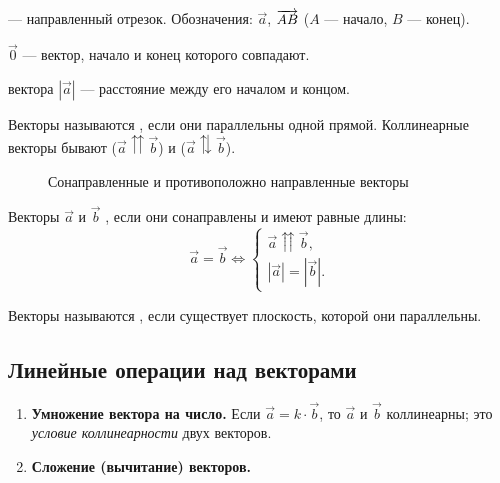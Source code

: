 \documentclass[11pt,a4paper]{article}
\begin{document}
\begin{opr}
 — направленный отрезок. Обозначения: $\vec a$, $\overrightarrow{AB}$ ($A$ — начало, $B$ — конец).
\end{opr}
\begin{opr}
 $\vec 0$ — вектор, начало и конец которого совпадают.
\end{opr}
\begin{opr}
 вектора $|\vec a|$ — расстояние между его началом и концом.
\end{opr}
\begin{opr}
Векторы называются , если они параллельны одной прямой. Коллинеарные векторы бывают
 ($\vec a\upuparrows\vec b$) и  ($\vec a\updownarrows\vec b$).
\end{opr}

\begin{figure}[H]
\centering
{}
\caption{Сонаправленные и противоположно направленные векторы}
\end{figure}

\begin{opr}
Векторы $\vec a$ и $\vec b$ , если они сонаправлены и имеют равные длины:
\[
\vec a=\vec b\iff\begin{cases}\vec a\upuparrows\vec b,\\ |\vec a|=|\vec b|.\end{cases}
\]
\end{opr}
\begin{opr}
Векторы называются , если существует плоскость, которой они параллельны.
\end{opr}

\subsection{Линейные операции над векторами}
\begin{enumerate}
\item \textbf{Умножение вектора на число.} Если $\vec a=k\cdot\vec b$, то $\vec a$ и $\vec b$ коллинеарны;
это \emph{условие коллинеарности} двух векторов.
\item \textbf{Сложение (вычитание) векторов.}
\end{enumerate}
\end{document}
